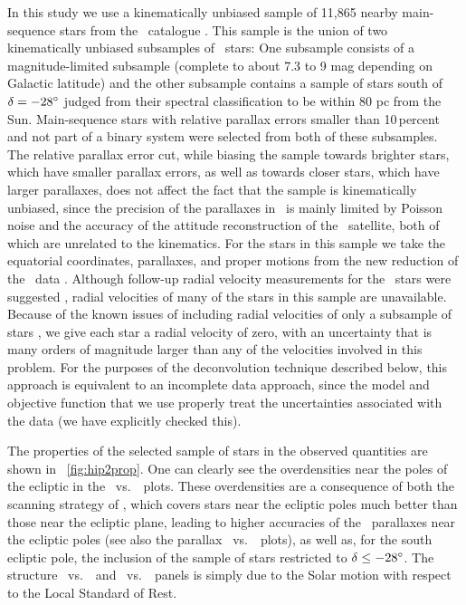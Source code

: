 In this study we use a kinematically unbiased sample of 11,865 nearby
main-sequence stars \citep{1998MNRAS.298..387D} from the \Hipparcos\
catalogue \citep{ESA97a}. This sample is the union of two
kinematically unbiased subsamples of \Hipparcos\ stars: One subsample
consists of a magnitude-limited subsample (complete to about 7.3 to 9
mag depending on Galactic latitude) and the other subsample contains a
sample of stars south of $\delta =-28^{\circ}$ judged from their spectral
classification to be within 80 pc from the Sun. Main-sequence stars
with relative parallax errors smaller than 10\,percent and not part of
a binary system were selected from both of these subsamples.  The
relative parallax error cut, while biasing the sample towards brighter
stars, which have smaller parallax errors, as well as towards closer
stars, which have larger parallaxes, does not affect the fact that the
sample is kinematically unbiased, since the precision of the
parallaxes in \Hipparcos\ is mainly limited by Poisson noise and the
accuracy of the attitude reconstruction of the \Hipparcos\ satellite,
both of which are unrelated to the kinematics. For the stars in this
sample we take the equatorial coordinates, parallaxes, and proper
motions from the new reduction of the \Hipparcos\ data
\citep{2007ASSL..250.....V,2007A&A...474..653V}. Although follow-up
radial velocity measurements for the \Hipparcos\ stars were suggested
\citep{1989Msngr..56...12G}, radial velocities of many of the stars in
this sample are unavailable. Because of the known issues of including
radial velocities of only a subsample of stars
\citep[\eg,][]{1997ESASP.402..473B}, we give each star a radial
velocity of zero, with an uncertainty that is many orders of magnitude
larger than any of the velocities involved in this problem. For the
purposes of the deconvolution technique described below, this approach
is equivalent to an incomplete data approach, since the model and
objective function that we use properly treat the uncertainties
associated with the data (we have explicitly checked this).

The properties of the selected sample of stars in the observed
quantities are shown in \figurename~\ref{fig:hip2prop}. One can
clearly see the overdensities near the poles of the ecliptic in the
\ra\ vs.~\dec\ plots. These overdensities are a consequence of both
the scanning strategy of \Hipparcos, which covers stars near the
ecliptic poles much better than those near the ecliptic plane, leading
to higher accuracies of the \Hipparcos{}es near the ecliptic
poles (see also the parallax \parallax\ vs.~\dec\ plots), as well as,
for the south ecliptic pole, the inclusion of the sample of stars
restricted to $\delta \leq -28^{\circ}$. The structure \pmra\ vs.~\ra\
and \pmra\ vs.~\dec\ panels is simply due to the Solar motion with
respect to the Local Standard of Rest.

